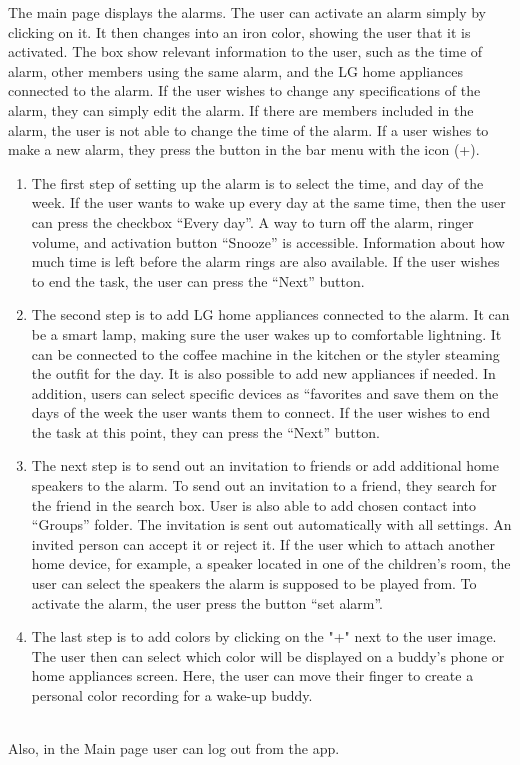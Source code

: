 \documentclass[conference]{IEEEtran}
\begin{document}
The main page displays the alarms. The user can activate an alarm simply by clicking on it. It then changes into an iron color, showing the user that it is activated. The box show relevant information to the user, such as the time of alarm, other members using the same alarm, and the LG home appliances connected to the alarm. If the user wishes to change any specifications of the alarm, they can simply edit the alarm. If there are members included in the alarm, the user is not able to change the time of the alarm. If a user wishes to make a new alarm, they press the button in the bar menu with the icon (+).
\begin{enumerate}
    \item The first step of setting up the alarm is to select the time, and day of the week. If the user wants to wake up every day at the same time, then the user can press the checkbox “Every day”. A way to turn off the alarm, ringer volume, and activation button “Snooze” is accessible. Information about how much time is left before the alarm rings are also available. If the user wishes to end the task, the user can press the “Next” button.
    \item The second step is to add LG home appliances connected to the alarm. It can be a smart lamp, making sure the user wakes up to comfortable lightning. It can be connected to the coffee machine in the kitchen or the styler steaming the outfit for the day. It is also possible to add new appliances if needed. In addition, users can select specific devices as “favorites and save them on the days of the week the user wants them to connect. If the user wishes to end the task at this point, they can press the “Next” button.
    \item The next step is to send out an invitation to friends or add additional home speakers to the alarm. To send out an invitation to a friend, they search for the friend in the search box. User is also able to add chosen contact into “Groups” folder. The invitation is sent out automatically with all settings. An invited person can accept it or reject it. If the user which to attach another home device, for example, a speaker located in one of the children's room, the user can select the speakers the alarm is supposed to be played from. To activate the alarm, the user press the button “set alarm”.
    \item The last step is to add colors by clicking on the "+" next to the user image. The user then can select which color will be displayed on a buddy’s phone or home appliances screen. Here, the user can move their finger to create a personal color recording for a wake-up buddy.

\end{enumerate} \\
Also, in the Main page user can log out from the app.
\end{document}
